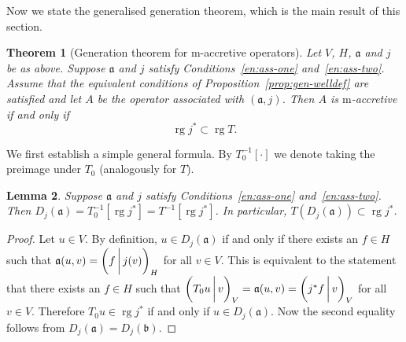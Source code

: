 \documentclass[a4paper,oneside,12pt]{amsart}
\theoremstyle{plain}
\newtheorem{theorem}{Theorem}[section]
\newtheorem{lemma}[theorem]{Lemma}
\theoremstyle{definition}
\begin{document}
Now we state the generalised generation theorem, which is the main result of this section.
\begin{theorem}[Generation theorem for {\ensuremath{\text{m}}}-accretive operators]\label{thm:gen-complete}
Let $V$, $H$, ${{\mathfrak{{a}}}}$ and $j$ be as above. 
Suppose ${{\mathfrak{{a}}}}$ and $j$ satisfy Conditions~\ref{en:ass-one} and~\ref{en:ass-two}.
Assume that the equivalent conditions of Proposition~\ref{prop:gen-welldef}
are satisfied and let $A$ be the operator associated with $({{\mathfrak{{a}}}},j)$. Then $A$ is {\ensuremath{\text{m}}}-accretive if and only if
\begin{equation}\label{eq:cond-macc}
    \operatorname{rg} j^*\subset\operatorname{rg} T.
\end{equation}
\end{theorem}

We first establish a simple general formula.
By $T_0^{-1}[\cdot]$ we denote taking the preimage under $T_0$ (analogously for $T$).
\begin{lemma}\label{lem:DHa-formula}
Suppose ${{\mathfrak{{a}}}}$ and $j$ satisfy Conditions~\ref{en:ass-one} and~\ref{en:ass-two}. Then 
$D_j({{\mathfrak{{a}}}})=T_0^{-1}[\operatorname{rg} j^*] = T^{-1}[\operatorname{rg} j^*]$. In particular, $T(D_j({{\mathfrak{{a}}}}))\subset \operatorname{rg} j^*$.
\end{lemma}
\begin{proof}
Let $u\in V$. By definition,
$u\in D_j({{\mathfrak{{a}}}})$ if and only if there exists an $f\in H$ such that ${{\mathfrak{{a}}}}(u,v)={{\ifthenelse{\equal{auto}{auto}}{\left({f}\mkern3mu{\biggm|}\mkern3mu {j(v)}\right)}{}
\ifthenelse{\equal{auto}{b}}{\bigl({f}\mkern3mu{\biggm|}\mkern3mu {j(v)}\bigr)}{}
\ifthenelse{\equal{auto}{B}}{\Bigl({f}\mkern3mu{\bigm|}\mkern3mu {j(v)}\Bigr)}{}
}}_H$ for all $v\in V$.
This is equivalent to the statement that there exists an $f\in H$ such that ${{\ifthenelse{\equal{auto}{auto}}{\left({T_0u}\mkern3mu{\biggm|}\mkern3mu {v}\right)}{}
\ifthenelse{\equal{auto}{b}}{\bigl({T_0u}\mkern3mu{\biggm|}\mkern3mu {v}\bigr)}{}
\ifthenelse{\equal{auto}{B}}{\Bigl({T_0u}\mkern3mu{\bigm|}\mkern3mu {v}\Bigr)}{}
}}_V={{\mathfrak{{a}}}}(u,v)={{\ifthenelse{\equal{auto}{auto}}{\left({j^*f}\mkern3mu{\biggm|}\mkern3mu {v}\right)}{}
\ifthenelse{\equal{auto}{b}}{\bigl({j^*f}\mkern3mu{\biggm|}\mkern3mu {v}\bigr)}{}
\ifthenelse{\equal{auto}{B}}{\Bigl({j^*f}\mkern3mu{\bigm|}\mkern3mu {v}\Bigr)}{}
}}_V$ for all $v\in V$. 
Therefore $T_0u\in\operatorname{rg} j^*$ if and only if $u\in D_j({{\mathfrak{{a}}}})$.
Now the second equality follows from $D_j({{\mathfrak{{a}}}})=D_j({{\mathfrak{{b}}}})$.
\end{proof}
\end{document}
